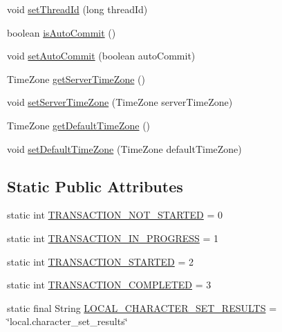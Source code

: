 \begin{DoxyCompactItemize}
\item 
void \mbox{\hyperlink{interfacecom_1_1mysql_1_1cj_1_1protocol_1_1_server_session_a376f1bef9dcabeda5451567df87ba210}{set\+Thread\+Id}} (long thread\+Id)
\item 
boolean \mbox{\hyperlink{interfacecom_1_1mysql_1_1cj_1_1protocol_1_1_server_session_a9c74fcf2711698d212e1f30a104a0425}{is\+Auto\+Commit}} ()
\item 
void \mbox{\hyperlink{interfacecom_1_1mysql_1_1cj_1_1protocol_1_1_server_session_a17b272e332ab95b8d67e8df8d3588908}{set\+Auto\+Commit}} (boolean auto\+Commit)
\item 
Time\+Zone \mbox{\hyperlink{interfacecom_1_1mysql_1_1cj_1_1protocol_1_1_server_session_ac9b676155f1488748f697afbf1e10999}{get\+Server\+Time\+Zone}} ()
\item 
void \mbox{\hyperlink{interfacecom_1_1mysql_1_1cj_1_1protocol_1_1_server_session_a0278632316cb6f88139c404062beb68e}{set\+Server\+Time\+Zone}} (Time\+Zone server\+Time\+Zone)
\item 
Time\+Zone \mbox{\hyperlink{interfacecom_1_1mysql_1_1cj_1_1protocol_1_1_server_session_a080efb1043278f9c6d13f7dc24d18476}{get\+Default\+Time\+Zone}} ()
\item 
void \mbox{\hyperlink{interfacecom_1_1mysql_1_1cj_1_1protocol_1_1_server_session_ae27787e7922817a157fdf6208e868756}{set\+Default\+Time\+Zone}} (Time\+Zone default\+Time\+Zone)
\end{DoxyCompactItemize}
\subsection*{Static Public Attributes}
\begin{DoxyCompactItemize}
\item 
static int \mbox{\hyperlink{interfacecom_1_1mysql_1_1cj_1_1protocol_1_1_server_session_a414b0a86133ab21c136db9193c914171}{T\+R\+A\+N\+S\+A\+C\+T\+I\+O\+N\+\_\+\+N\+O\+T\+\_\+\+S\+T\+A\+R\+T\+ED}} = 0
\item 
static int \mbox{\hyperlink{interfacecom_1_1mysql_1_1cj_1_1protocol_1_1_server_session_a42bea0e6f2940fd0147e510bdaa972f3}{T\+R\+A\+N\+S\+A\+C\+T\+I\+O\+N\+\_\+\+I\+N\+\_\+\+P\+R\+O\+G\+R\+E\+SS}} = 1
\item 
static int \mbox{\hyperlink{interfacecom_1_1mysql_1_1cj_1_1protocol_1_1_server_session_af60b0a2d347c48deeb686f4a47510b5d}{T\+R\+A\+N\+S\+A\+C\+T\+I\+O\+N\+\_\+\+S\+T\+A\+R\+T\+ED}} = 2
\item 
static int \mbox{\hyperlink{interfacecom_1_1mysql_1_1cj_1_1protocol_1_1_server_session_a6dc86c338ef7963bf59af8b1c0675dde}{T\+R\+A\+N\+S\+A\+C\+T\+I\+O\+N\+\_\+\+C\+O\+M\+P\+L\+E\+T\+ED}} = 3
\item 
static final String \mbox{\hyperlink{interfacecom_1_1mysql_1_1cj_1_1protocol_1_1_server_session_a577471e7807b77f7b56c27a243e15919}{L\+O\+C\+A\+L\+\_\+\+C\+H\+A\+R\+A\+C\+T\+E\+R\+\_\+\+S\+E\+T\+\_\+\+R\+E\+S\+U\+L\+TS}} = \char`\"{}local.\+character\+\_\+set\+\_\+results\char`\"{}
\end{DoxyCompactItemize}



